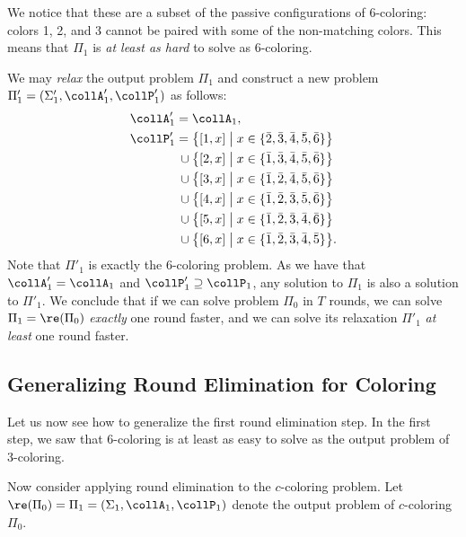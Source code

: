 We notice that these are a subset of the passive configurations of 6-coloring: colors 1, 2, and 3 cannot be paired with some of the non-matching colors. This means that $\Pi_1$ is \emph{at least as hard} to solve as 6-coloring.

We may \emph{relax} the output problem $\Pi_1$ and construct a new problem $\Pi'_1 = (\Sigma'_1, \collA'_1, \collP'_1)$ as follows:
\begingroup
\allowdisplaybreaks
\begin{align*}
 \collA'_1 = {}&\collA_1,\\
 \collP'_1
       = {}&\bigl\{ [1, x] \bigm| x \in \{ \bar{2}, \bar{3}, \bar{4}, \bar{5}, \bar{6} \} \bigr\} \\
 {} \cup {}&\bigl\{ [2, x] \bigm| x \in \{ \bar{1}, \bar{3}, \bar{4}, \bar{5}, \bar{6} \} \bigr\} \\
 {} \cup {}&\bigl\{ [3, x] \bigm| x \in \{ \bar{1}, \bar{2}, \bar{4}, \bar{5}, \bar{6} \} \bigr\} \\
 {} \cup {}&\bigl\{ [4, x] \bigm| x \in \{ \bar{1}, \bar{2}, \bar{3}, \bar{5}, \bar{6} \} \bigr\} \\
 {} \cup {}&\bigl\{ [5, x] \bigm| x \in \{ \bar{1}, \bar{2}, \bar{3}, \bar{4}, \bar{6} \} \bigr\} \\
 {} \cup {}&\bigl\{ [6, x] \bigm| x \in \{ \bar{1}, \bar{2}, \bar{3}, \bar{4}, \bar{5} \} \bigr\}.
\end{align*}
\endgroup
Note that $\Pi'_1$ is exactly the $6$-coloring problem. As we have that $\collA'_1 = \collA_1$ and $\collP'_1 \supseteq \collP_1$, any solution to $\Pi_1$ is also a solution to $\Pi'_1$. We conclude that if we can solve problem $\Pi_0$ in $T$ rounds, we can solve $\Pi_1 = \re(\Pi_0)$ \emph{exactly} one round faster, and we can solve its relaxation $\Pi'_1$ \emph{at least} one round faster.

\subsection{Generalizing Round Elimination for Coloring}

Let us now see how to generalize the first round elimination step. In the first step, we saw that 6-coloring is at least as easy to solve as the output problem of 3-coloring.

Now consider applying round elimination to the $c$-coloring problem. Let $\re(\Pi_0) = \Pi_1 = (\Sigma_1,\collA_1, \collP_1)$ denote the output problem of $c$-coloring $\Pi_0$.

